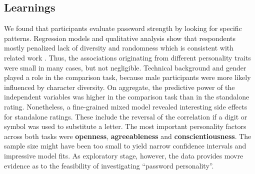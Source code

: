 \subsection{Learnings}
We found that participants evaluate password strength by looking for specific patterns. Regression models and qualitative analysis show that respondents mostly penalized lack of diversity and randomness which is consistent with related work \cite{Ur2016PerceptionsPassword}. Thus, the associations originating from different personality traits were small in many cases, but not negligible. Technical background and gender played a role in the comparison task, because male participants were more likely influenced by character diversity. On aggregate, the predictive power of the independent variables was higher in the comparison task than in the standalone rating. Nonetheless, a fine-grained mixed model revealed interesting side effects for standalone ratings. These include the reversal of the correlation if a digit or symbol was used to substitute a letter. The most important personality factors across both tasks were \textbf{openness}, \textbf{agreeableness} and \textbf{conscientiousness}. The sample size might have been too small to yield narrow confidence intervals and impressive model fits. As exploratory stage, however, the data provides movre evidence as to the feasibility of investigating ``password personality''. 